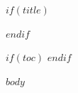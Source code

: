 \documentclass[$if(documentclass)$$documentclass$$else$book$endif$,$if(fontsize)$$fontsize$,$endif$]{$if(documentclass)$$documentclass$$else$book$endif$}
\begin{document}
$if(title)$
\maketitle
$endif$

$if(toc)$
\tableofcontents
\newpage
$endif$

$body$
\end{document}
